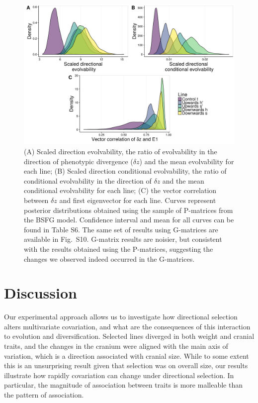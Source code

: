 \begin{refsection}
\begin{figure}
    \centering
    \includegraphics[width=\textwidth]{chapter_ratones/media/figure4.png}
    \caption[Directional evolutionary statistics in selected and control lines]{(A)
Scaled direction evolvability, the ratio of evolvability in the
direction of phenotypic divergence (\(\delta z\)) and the mean
evolvability for each line; (B) Scaled direction conditional
evolvability, the ratio of conditional evolvability in the direction of
\(\delta z\) and the mean conditional evolvability for each line; (C)
the vector correlation between \(\delta z\) and first eigenvector for
each line. Curves represent posterior distributions obtained using the
sample of P-matrices from the BSFG model. Confidence interval and mean
for all curves can be found in Table S6. The same set of results using
G-matrices are available in Fig.~S10. G-matrix results are noisier, but
consistent with the results obtained using the P-matrices, suggesting
the changes we observed indeed occurred in the G-matrices.}
    \label{fig-dzpc1}
\end{figure}

\section{Discussion}

Our experimental approach allows us to investigate how directional
selection alters multivariate covariation, and what are the consequences
of this interaction to evolution and diversification. Selected lines
diverged in both weight and cranial traits, and the changes in the
cranium were aligned with the main axis of variation, which is a
direction associated with cranial size. While to some extent this is an
unsurprising result given that selection was on overall size, our
results illustrate how rapidly covariation can change under directional
selection. In particular, the magnitude of association between traits is
more malleable than the pattern of association.


\end{refsection}
